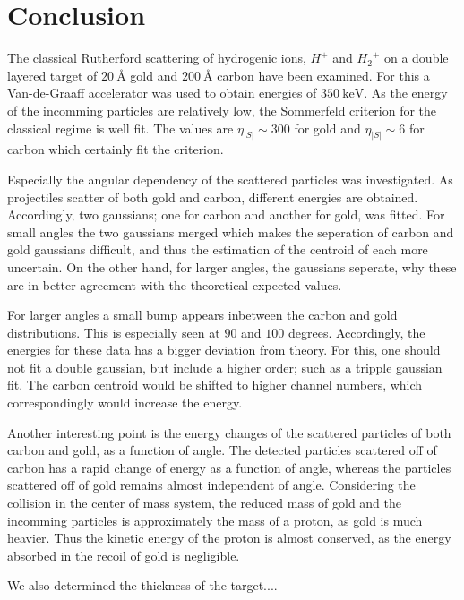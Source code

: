 \clearpage
\section{Conclusion}
The classical Rutherford scattering of hydrogenic ions, $H^+$ and ${H_2}^+$ on
a double layered target of $\SI{20}{\angstrom}$ gold and $\SI{200}{\angstrom}$
carbon have been examined.
For this a Van-de-Graaff accelerator was used to obtain energies of
$\SI{350}{\kilo\electronvolt}$. As the energy of the incomming particles are
relatively low, the Sommerfeld criterion for the classical regime is well fit.
The values are $\eta_|S| \sim 300$ for gold and $\eta_|S| \sim 6$ for carbon
which certainly fit the criterion.

Especially the angular dependency of the scattered particles was investigated.
As projectiles scatter of both gold and carbon, different energies are
obtained. Accordingly, two gaussians; one for carbon and another for gold, was
fitted. For small angles the two gaussians merged which makes the seperation of
carbon and gold gaussians difficult, and thus the estimation of the centroid of
each more uncertain. On the other hand, for larger angles, the gaussians
seperate, why these are in better agreement with the theoretical expected
values.

For larger angles a small bump appears inbetween the carbon and gold
distributions. This is especially seen at $90$ and $100$ degrees. Accordingly,
the energies for these data has a bigger deviation from theory. For this, one
should not fit a double gaussian, but include a higher order; such as a tripple
gaussian fit. The carbon centroid would be shifted to higher channel numbers,
which correspondingly would increase the energy. 

Another interesting point is the energy changes of the scattered particles of
both carbon and gold, as a function of angle. The detected particles scattered
off of carbon has a rapid change of energy as a function of angle, whereas the
particles scattered off of gold remains almost independent of angle.
Considering the collision in the center of mass system, the reduced mass of
gold and the incomming particles is approximately the mass of a proton, as gold
is much heavier. Thus the kinetic energy of the proton is almost conserved, as
the energy absorbed in the recoil of gold is negligible. 

We also determined the thickness of the target....

\vfill

